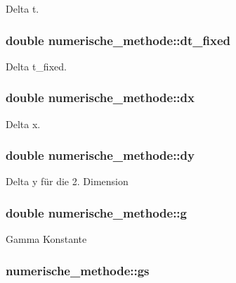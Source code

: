 Delta t. \hypertarget{classnumerische__methode_a4f188b1788413cb68a14dbe1d8a5846a}{
\subsubsection[{dt\-\_\-fixed}]{\setlength{\rightskip}{0pt plus 5cm}double numerische\-\_\-methode\-::dt\-\_\-fixed\hspace{0.3cm}{\ttfamily [protected]}}}\label{classnumerische__methode_a4f188b1788413cb68a14dbe1d8a5846a}
Delta t\-\_\-fixed. \hypertarget{classnumerische__methode_af35cb44a6bdcfed96bdcee642aa7f67e}{
\subsubsection[{dx}]{\setlength{\rightskip}{0pt plus 5cm}double numerische\-\_\-methode\-::dx\hspace{0.3cm}{\ttfamily [protected]}}}\label{classnumerische__methode_af35cb44a6bdcfed96bdcee642aa7f67e}
Delta x. \hypertarget{classnumerische__methode_a6668ec54293e469ff9c169dfbb72e3d4}{
\subsubsection[{dy}]{\setlength{\rightskip}{0pt plus 5cm}double numerische\-\_\-methode\-::dy\hspace{0.3cm}{\ttfamily [protected]}}}\label{classnumerische__methode_a6668ec54293e469ff9c169dfbb72e3d4}
Delta y für die 2. Dimension \hypertarget{classnumerische__methode_a8adb2a525c7877c531fa960ee5f0176b}{
\subsubsection[{g}]{\setlength{\rightskip}{0pt plus 5cm}double numerische\-\_\-methode\-::g\hspace{0.3cm}{\ttfamily [protected]}}}\label{classnumerische__methode_a8adb2a525c7877c531fa960ee5f0176b}
Gamma Konstante \hypertarget{classnumerische__methode_ae9920302fb4e0fae9f055c0dcdff8b5a}{
\subsubsection[{gs}]{ numerische\-\_\-methode\-::gs\hspace{0.3cm}{\ttfamily [protected]}}}\label{classnumerische__methode_ae9920302fb4e0fae9f055c0dcdff8b5a}
